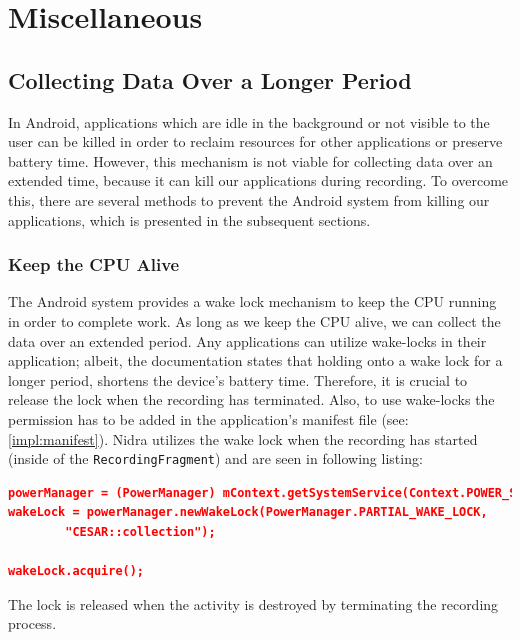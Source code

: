

\section{Miscellaneous}

\subsection{Collecting Data Over a Longer Period}
In Android, applications which are idle in the background or not visible to the user can be killed in order to reclaim resources for other applications or preserve battery time. However, this mechanism is not viable for collecting data over an extended time, because it can kill our applications during recording. To overcome this, there are several methods to prevent the Android system from killing our applications, which is presented in the subsequent sections.

\subsubsection{Keep the CPU Alive}
The Android system provides a wake lock mechanism to keep the CPU running in order to complete work. As long as we keep the CPU alive, we can collect the data over an extended period. Any applications can utilize wake-locks in their application; albeit, the documentation states that holding onto a wake lock for a longer period, shortens the device's battery time. Therefore, it is crucial to release the lock when the recording has terminated. Also, to use wake-locks the permission has to be added in the application's manifest file (see: \ref{impl:manifest}). Nidra utilizes the wake lock when the recording has started (inside of the \verb|RecordingFragment|) and are seen in following listing:

\begin{lstlisting}[language=json, caption={}, captionpos=b]
powerManager = (PowerManager) mContext.getSystemService(Context.POWER_SERVICE);
wakeLock = powerManager.newWakeLock(PowerManager.PARTIAL_WAKE_LOCK,
        "CESAR::collection");

wakeLock.acquire();
\end{lstlisting}
The lock is released when the activity is destroyed by terminating the recording process.


